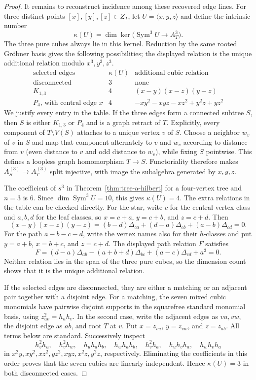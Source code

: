\documentclass[11pt]{amsart}
\theoremstyle{plain}
\theoremstyle{definition}
\theoremstyle{remark}
\begin{document}
\begin{proof}
It remains to reconstruct incidence among these recovered edge lines.  For
three distinct points $[x],[y],[z]\in Z_T$, let $U=\langle x,y,z\rangle$ and
define the intrinsic number
\[
  \kappa(U)=\dim\ker\bigl(\operatorname{Sym}^3U\longrightarrow A_T^3\bigr).
\]
The three pure cubes always lie in this kernel.  Reduction by the same rooted
Gr\"obner basis gives the following possibilities; the displayed relation is
the unique additional relation modulo $x^3,y^3,z^3$.
\[
\begin{array}{c|c|c}
\text{selected edges}&\kappa(U)&\text{additional cubic relation}\\ \hline
\text{disconnected}&3&\text{none}\\
K_{1,3}&4&(x-y)(x-z)(y-z)\\
P_4\text{, with central edge }x&4&
  -xy^2-xyz-xz^2+y^2z+yz^2
\end{array}
\]
We justify every entry in the table.  If the three edges form a connected
subtree $S$, then $S$ is either $K_{1,3}$ or $P_4$ and is a graph retract of
$T$.  Explicitly, every component of $T\setminus V(S)$ attaches to a unique
vertex $v$ of $S$.  Choose a neighbor $w_v$ of $v$ in $S$ and map that
component alternately to $v$ and $w_v$ according to distance from $v$ (even
distance to $v$ and odd distance to $w_v$), while fixing $S$ pointwise.  This
defines a loopless graph homomorphism
$T\to S$.  Functoriality therefore makes $A_S^{(3)}\to A_T^{(3)}$ split
injective, with image the subalgebra generated by $x,y,z$.

The coefficient of $s^3$ in Theorem~\ref{thm:tree-a-hilbert} for a four-vertex
tree and $n=3$ is $6$.  Since $\dim\operatorname{Sym}^3U=10$, this gives
$\kappa(U)=4$.  The extra relations in the table can be checked directly.
For the star, write $c$ for the central vertex class and $a,b,d$ for the leaf
classes, so $x=c+a$, $y=c+b$, and $z=c+d$.  Then
\[
  (x-y)(x-z)(y-z)
  =(b-d)\Delta_{ca}+(d-a)\Delta_{cb}+(a-b)\Delta_{cd}=0.
\]
For the path $a-b-c-d$, write the vertex names also for their $h$-classes and
put $y=a+b$, $x=b+c$, and $z=c+d$.  The displayed path relation $F$ satisfies
\[
  F=(d-a)\Delta_{ab}-(a+b+d)\Delta_{bc}
    +(a-c)\Delta_{cd}+a^3=0.
\]
Neither relation lies in the span of the three pure cubes, so the dimension
count shows that it is the unique additional relation.

If the selected edges are disconnected, they are either a matching or an
adjacent pair together with a disjoint edge.  For a matching, the seven mixed
cubic monomials have pairwise disjoint supports in the squarefree standard
monomial basis, using $z_{uv}^2=h_uh_v$.  In the second case, write the
adjacent edges as $vu,vw$, the disjoint edge as $ab$, and root $T$ at $v$.
Put $x=z_{vu}$, $y=z_{vw}$, and $z=z_{ab}$.  All terms below are standard.
Successively inspect
\[
  h_v^2h_u,\quad h_v^2h_w,\quad h_uh_ah_b,\quad h_wh_ah_b,
  \quad h_v^2h_a,\quad h_uh_vh_a,\quad h_wh_vh_a
\]
in $x^2y,xy^2,xz^2,yz^2,xyz,x^2z,y^2z$, respectively.  Eliminating the
coefficients in this order proves that the seven cubics are linearly
independent.  Hence $\kappa(U)=3$ in both disconnected cases.


\end{proof}
\end{document}
